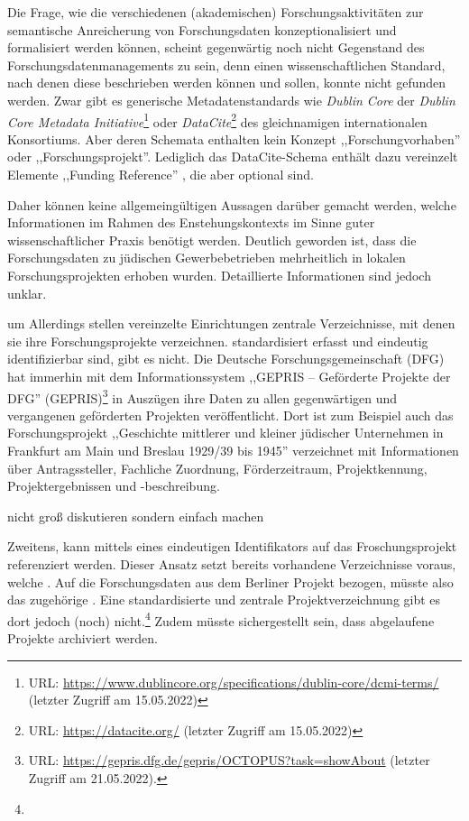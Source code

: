 Die Frage, wie die verschiedenen (akademischen) Forschungsaktivitäten zur semantische Anreicherung von Forschungsdaten konzeptionalisiert und formalisiert werden können, scheint gegenwärtig noch nicht Gegenstand des Forschungsdatenmanagements zu sein, denn einen wissenschaftlichen Standard, nach denen diese beschrieben werden können und sollen, konnte nicht gefunden werden. Zwar gibt es generische Metadatenstandards wie \textit{Dublin Core} der \textit{Dublin Core Metadata Initiative}\footnote{URL: \url{https://www.dublincore.org/specifications/dublin-core/dcmi-terms/} (letzter Zugriff am 15.05.2022)} oder \textit{DataCite}\footnote{URL: \url{https://datacite.org/} (letzter Zugriff am 15.05.2022)} des gleichnamigen internationalen Konsortiums. Aber deren Schemata enthalten kein Konzept ,,Forschungvorhaben'' oder ,,Forschungsprojekt''. Lediglich das DataCite-Schema enthält dazu vereinzelt Elemente ,,Funding Reference'' , die aber optional sind.


Daher können keine allgemeingültigen Aussagen darüber gemacht werden, welche Informationen im Rahmen des Enstehungskontexts im Sinne guter wissenschaftlicher Praxis benötigt werden. Deutlich geworden ist, dass die Forschungsdaten zu jüdischen Gewerbebetrieben mehrheitlich in lokalen Forschungsprojekten erhoben wurden. Detaillierte Informationen sind jedoch unklar.


um Allerdings stellen vereinzelte Einrichtungen zentrale Verzeichnisse, mit denen sie ihre Forschungsprojekte verzeichnen. standardisiert erfasst und eindeutig identifizierbar sind, gibt es nicht. Die Deutsche Forschungsgemeinschaft (DFG) hat immerhin mit dem Informationssystem ,,GEPRIS – Geförderte Projekte der DFG'' (GEPRIS)\footnote{URL: \url{https://gepris.dfg.de/gepris/OCTOPUS?task=showAbout} (letzter Zugriff am 21.05.2022).} in Auszügen ihre Daten zu allen gegenwärtigen und vergangenen geförderten Projekten veröffentlicht. Dort ist zum Beispiel auch das Forschungsprojekt ,,Geschichte mittlerer und kleiner jüdischer Unternehmen in Frankfurt am Main und Breslau 1929/39 bis 1945'' verzeichnet mit Informationen über Antragssteller, Fachliche Zuordnung, Förderzeitraum, Projektkennung, Projektergebnissen und -beschreibung. 

nicht groß diskutieren sondern einfach machen




Zweitens, kann mittels eines eindeutigen Identifikators auf das Froschungsprojekt referenziert werden. Dieser Ansatz setzt bereits vorhandene Verzeichnisse voraus, welche . Auf die Forschungsdaten aus dem Berliner Projekt bezogen, müsste also das zugehörige . Eine standardisierte und zentrale Projektverzeichnung gibt es dort jedoch (noch) nicht.\footnote{} Zudem müsste sichergestellt sein, dass abgelaufene Projekte archiviert werden.

